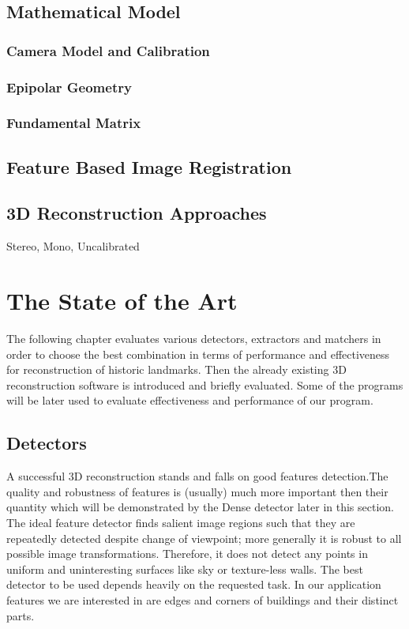 \section{Mathematical Model}
\subsection*{Camera Model and Calibration}
\subsection*{Epipolar Geometry}
\subsection*{Fundamental Matrix}
\section{Feature Based Image Registration}
\section{3D Reconstruction Approaches}
Stereo, Mono, Uncalibrated

\chapter{The State of the Art}
\label{chapter:the-state-of-the-art}
The following chapter evaluates various detectors, extractors and matchers in order to choose the best combination in terms of performance and effectiveness for reconstruction of historic landmarks. Then the already existing 3D reconstruction software is introduced and briefly evaluated. Some of the programs will be later used to evaluate effectiveness and performance of our program.

\section{Detectors}
A successful 3D reconstruction stands and falls on good features detection.The quality and robustness of features is (usually) much more important then their quantity which will be demonstrated by the Dense detector later in this section. The ideal feature detector finds salient image regions such that they are repeatedly detected despite change of viewpoint; more generally it is robust to all possible image transformations. Therefore, it does not detect any points in uniform and uninteresting surfaces like sky or texture-less walls. The best detector to be used depends heavily on the requested task. In our application features we are interested in are edges and corners of buildings and their distinct parts.

